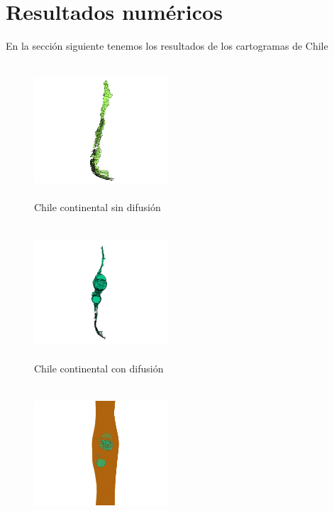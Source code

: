 \documentclass[20pt]{report}
\begin{document}
\begin{itemize}
\label{cap.introduccion}\section{Resultados num\'ericos} 
En la secci\'on siguiente tenemos los resultados de los cartogramas de Chile
\begin{figure}[H]
\begin{center}
\includegraphics[width=5cm, height=5cm]{Chile.png}
\vspace{-0.5cm} %
\caption{Chile continental sin difusi\'on}
\label{Label para referencia}
\end{center}
\end{figure}
\begin{figure}[H]
\begin{center}
\includegraphics[width=5cm, height=5cm]{1.png}
\vspace{-0.5cm} %
\caption{Chile continental con difusi\'on}
\label{Label para referencia}
\end{center}
\end{figure}
\begin{figure}[H]
\begin{center}
\includegraphics[width=5cm, height=5cm]{malla.png}

\end{center}
\end{figure}
\end{itemize}
\end{document}
